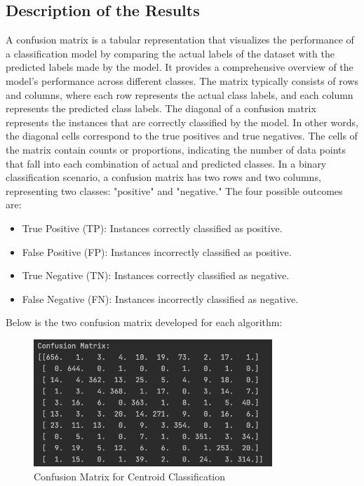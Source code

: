 \documentclass{article} %
\begin{document}
          \subsection{Description of the Results}
            \label{SECT:SUBSECTION 3.2}
                A confusion matrix is a tabular representation that visualizes the performance of a classification model by comparing the actual labels of the dataset with the predicted labels made by the model. It provides a comprehensive overview of the model's performance across different classes. The matrix typically consists of rows and columns, where each row represents the actual class labels, and each column represents the predicted class labels. The diagonal of a confusion matrix represents the instances that are correctly classified by the model. In other words, the diagonal cells correspond to the true positives and true negatives. The cells of the matrix contain counts or proportions, indicating the number of data points that fall into each combination of actual and predicted classes. In a binary classification scenario, a confusion matrix has two rows and two columns, representing two classes: "positive" and "negative." The four possible outcomes are:
                \begin{itemize}
                    \item True Positive (TP): Instances correctly classified as positive.
                    \item False Positive (FP): Instances incorrectly classified as positive.
                    \item True Negative (TN): Instances correctly classified as negative.
                    \item False Negative (FN): Instances incorrectly classified as negative.
                \end{itemize}
                Below is the two confusion matrix developed for each algorithm:
                \begin{figure}[h]
                    \centering
                    \includegraphics[width=9cm]{Conf_Matrix_1.png}
                    \caption{Confusion Matrix for Centroid Classification}
                    \label{fig:fig3}
                \end{figure}
\end{document}
